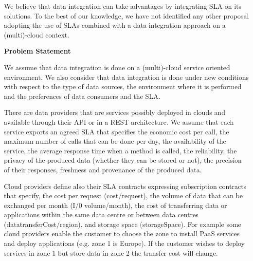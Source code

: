 \documentclass[12pt,a4paper,oneside]{report}
\begin{document}
We believe that data integration can take advantages by integrating SLA on its solutions. To the best of our knowledge, we have not identified any other proposal adopting the use of SLAs combined with a data integration approach on a (multi)-cloud context.

\begin{flushleft}
\textbf{Problem Statement}\\
\end{flushleft}

We assume that data integration is done on a (multi)-cloud service oriented environment. We also consider that data integration is done under new conditions with respect to the type of data sources, the environment where it is performed and the preferences  of data consumers and the SLA. 

There are data providers that are services possibly deployed in clouds and available  through their API or in a REST architecture. We assume that  each service exports an agreed SLA that specifies the economic cost per call, the maximum number of calls that can be done per day, the availability of the service, the average response time when a method is called, the reliability, the privacy of the produced data (whether they can be stored or not), the precision of their responses, freshness and provenance of the produced data.  



Cloud providers define also their SLA contracts expressing  subscription contracts that specify, the cost per request ({\sf cost/request}), the volume of data that can be exchanged per month ({\sf I/0 volume/month}), the cost of transferring data or applications within the same data centre or between data centres ({\sf datatransferCost/region}), and storage space ({\sf storageSpace}). For example some cloud providers enable the customer to choose the zone to install PaaS services and deploy applications (e.g. zone 1 is Europe). If the customer wishes to deploy services in zone 1 but store data in zone 2 the transfer cost will change.
\end{document}
